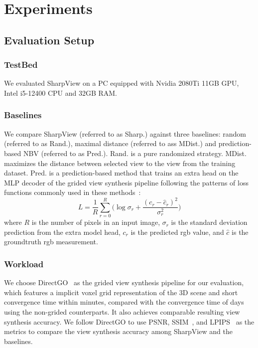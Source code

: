 \section{Experiments\label{exp}}
\subsection{Evaluation Setup}
\subsubsection*{TestBed} We evaluated SharpView on a PC equipped with Nvidia 2080Ti 11GB GPU, Intel i5-12400 CPU and 32GB RAM. 

\subsubsection*{Baselines} We compare SharpView (referred to as Sharp.) against three baselines: random (referred to as Rand.), maximal distance (referred to ass MDist.) and prediction-based NBV (referred to as Pred.).
Rand. is a pure randomized strategy.
MDist. maximizes the distance between selected view to the view from the training dataset.
Pred. is a prediction-based method that trains an extra head on the MLP decoder of the grided view synthesis pipeline
following the patterns of loss functions commonly used in these methods~\cite{shen_stochastic_2021,jin_neu-nbv_2023,ran_neurar_2023,avidan_activenerf_2022}: 
\begin{equation}
    L = \frac{1}{R} \sum_{r=0}^R  \big ( \log \sigma_r + \frac{(c_r-\hat{c}_r)^2}{\sigma_r^2} \big )
    \label{uncertainty}
\end{equation}
where $R$ is the number of pixels in an input image, $\sigma_r$ is the standard deviation prediction from the extra model head, $c_r$ is the predicted rgb value, and $\hat{c}$ is the groundtruth rgb measurement.

\subsubsection*{Workload}
We choose DirectGO~\cite{sun_direct_2022} as the grided view synthesis pipeline for our evaluation, which features a implicit voxel grid representation of the 3D scene and short convergence time within minutes, compared with the convergence time of days using the non-grided counterparts.
It also achieves comparable resulting view synthesis accuracy.
We follow DirectGO to use PSNR, SSIM~\cite{1284395}, and LPIPS~\cite{8578166} as the metrics to compare the view synthesis accuracy among SharpView and the baselines.

